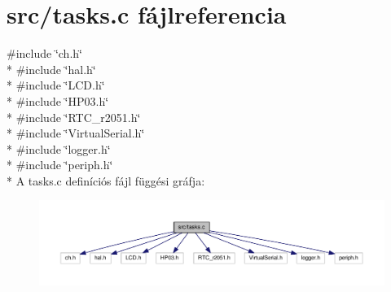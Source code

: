 \section{src/tasks.c fájlreferencia}
\label{tasks_8c}
{\ttfamily \#include \char`\"{}ch.\-h\char`\"{}}\\*
{\ttfamily \#include \char`\"{}hal.\-h\char`\"{}}\\*
{\ttfamily \#include \char`\"{}L\-C\-D.\-h\char`\"{}}\\*
{\ttfamily \#include \char`\"{}H\-P03.\-h\char`\"{}}\\*
{\ttfamily \#include \char`\"{}R\-T\-C\-\_\-r2051.\-h\char`\"{}}\\*
{\ttfamily \#include \char`\"{}Virtual\-Serial.\-h\char`\"{}}\\*
{\ttfamily \#include \char`\"{}logger.\-h\char`\"{}}\\*
{\ttfamily \#include \char`\"{}periph.\-h\char`\"{}}\\*
A tasks.\-c definíciós fájl függési gráfja\-:
\nopagebreak
\begin{figure}[H]
\begin{center}
\leavevmode
\includegraphics[width=350pt]{tasks_8c__incl}
\end{center}
\end{figure}
